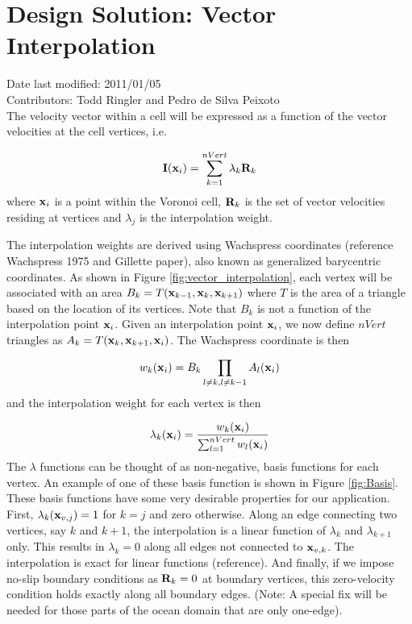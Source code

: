 \documentclass[11pt]{report}
\begin{document}
\section{Design Solution: Vector Interpolation}
Date last modified: 2011/01/05 \\
Contributors: Todd Ringler and Pedro de Silva Peixoto \\

The velocity vector within a cell will be expressed as a function of the vector velocities at the cell vertices, i.e.

\begin{equation}
{\bf I}({\bf x}_i) = \sum_{k=1}^{nVert} \lambda_k {\bf R}_k
\end{equation}
where ${\bf x}_i$ is a point within the Voronoi cell, ${\bf R}_k$ is the set of vector velocities residing at vertices and $\lambda_j$ is the interpolation weight.

The interpolation weights are derived using Wachspress coordinates (reference Wachspress 1975 and Gillette paper), also known as generalized barycentric coordinates.  As shown in Figure \ref{fig:vector_interpolation}, each vertex will be associated with an area $B_k = T({\bf x}_{k-1},{\bf x}_k,{\bf x}_{k+1})$ where $T$ is the area of a triangle based on the location of its vertices. Note that $B_k$ is not a function of the interpolation point ${\bf x}_i$. Given an interpolation point ${\bf x}_i$, we now define $nVert$ triangles as $A_k = T({\bf x}_{k},{\bf x}_{k+1},{\bf x}_{i})$. The Wachspress coordinate is then

\begin{equation}
w_k({\bf x}_i) = B_k \prod_{l \ne k, l \ne k-1} A_l({\bf x}_i)
\end{equation}
and the interpolation weight for each vertex is then

\begin{equation}
\lambda_k({\bf x}_i)= \frac{w_k({\bf x}_i)}{\sum_{l=1}^{nVert} w_l({\bf x}_i)}
\end{equation}
The $\lambda$ functions can be thought of as non-negative, basis functions for each vertex. An example of one of these basis function is shown in Figure \ref{fig:Basis}. These basis functions have some very desirable properties for our application. First, $\lambda_k({\bf x}_{v,j})=1$ for $k=j$ and zero otherwise. Along an edge connecting two vertices, say $k$ and $k+1$, the interpolation is a linear function of $\lambda_k$ and $\lambda_{k+1}$ only. This results in $\lambda_k=0$ along all edges not connected to ${\bf x}_{v,k}$. The interpolation is exact for linear functions (reference). And finally, if we impose no-slip boundary conditions as ${\bf R}_k=0$ at boundary vertices, this zero-velocity condition holds exactly along all boundary edges. (Note: A special fix will be needed for those parts of the ocean domain that are only one-edge). 
\end{document}
